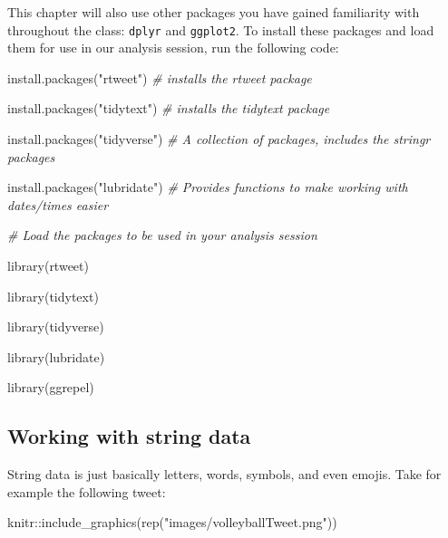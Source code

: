 \documentclass[
]{book}
\newenvironment{Shaded}{\begin{snugshade}}{\end{snugshade}}
\newcommand{\CommentTok}[1]{\textcolor[rgb]{0.56,0.35,0.01}{\textit{#1}}}
\newcommand{\FunctionTok}[1]{\textcolor[rgb]{0.00,0.00,0.00}{#1}}
\newcommand{\NormalTok}[1]{#1}
\newcommand{\SpecialCharTok}[1]{\textcolor[rgb]{0.00,0.00,0.00}{#1}}
\newcommand{\StringTok}[1]{\textcolor[rgb]{0.31,0.60,0.02}{#1}}
\begin{document}
This chapter will also use other packages you have gained familiarity with throughout the class: \texttt{dplyr} and \texttt{ggplot2}. To install these packages and load them for use in our analysis session, run the following code:

\begin{Shaded}
\begin{Highlighting}[]
\FunctionTok{install.packages}\NormalTok{(}\StringTok{"rtweet"}\NormalTok{) }\CommentTok{\# installs the rtweet package}

\FunctionTok{install.packages}\NormalTok{(}\StringTok{"tidytext"}\NormalTok{) }\CommentTok{\# installs the tidytext package}

\FunctionTok{install.packages}\NormalTok{(}\StringTok{"tidyverse"}\NormalTok{) }\CommentTok{\# A collection of packages, includes the stringr packages}

\FunctionTok{install.packages}\NormalTok{(}\StringTok{"lubridate"}\NormalTok{) }\CommentTok{\# Provides functions to make working with dates/times easier}
\end{Highlighting}
\end{Shaded}

\begin{Shaded}
\begin{Highlighting}[]
\CommentTok{\# Load the packages to be used in your analysis session}

\FunctionTok{library}\NormalTok{(rtweet)}

\FunctionTok{library}\NormalTok{(tidytext)}

\FunctionTok{library}\NormalTok{(tidyverse)}

\FunctionTok{library}\NormalTok{(lubridate)}

\FunctionTok{library}\NormalTok{(ggrepel)}
\end{Highlighting}
\end{Shaded}

\hypertarget{working-with-string-data}{%
\subsection{Working with string data}\label{working-with-string-data}}

String data is just basically letters, words, symbols, and even emojis. Take for example the following tweet:

\begin{Shaded}
\begin{Highlighting}[]
\NormalTok{knitr}\SpecialCharTok{::}\FunctionTok{include\_graphics}\NormalTok{(}\FunctionTok{rep}\NormalTok{(}\StringTok{"images/volleyballTweet.png"}\NormalTok{))}
\end{Highlighting}
\end{Shaded}
\end{document}
